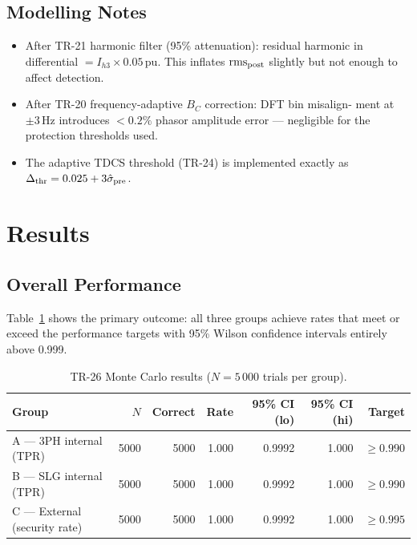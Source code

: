 \documentclass[11pt,a4paper]{article}
\begin{document}
\subsection{Modelling Notes}

\begin{itemize}
  \item After TR-21 harmonic filter (95\% attenuation): residual harmonic
    in differential $= I_{h3} \times 0.05$\,pu.  This inflates
    $\mathrm{rms}_{\rm post}$ slightly but not enough to affect detection.
  \item After TR-20 frequency-adaptive $B_C$ correction: DFT bin misalign-
    ment at $\pm 3$\,Hz introduces $<0.2\%$ phasor amplitude error —
    negligible for the protection thresholds used.
  \item The adaptive TDCS threshold (TR-24) is implemented exactly as
    $\Delta_{\rm thr} = 0.025 + 3\hat{\sigma}_{\rm pre}$.
\end{itemize}

\section{Results}

\subsection{Overall Performance}

Table~\ref{tab:results} shows the primary outcome: all three groups achieve
rates that meet or exceed the performance targets with 95\% Wilson
confidence intervals entirely above 0.999.

\begin{table}[h!]
\centering
\caption{TR-26 Monte Carlo results ($N = 5\,000$ trials per group).}
\label{tab:results}
\begin{tabular}{lrrrrrr}
\toprule
Group & $N$ & Correct & Rate & 95\% CI (lo) & 95\% CI (hi) & Target \\
\midrule
A — 3PH internal (TPR)       & 5000 & 5000 & 1.000 & 0.9992 & 1.000 & $\geq 0.990$ \\
B — SLG internal (TPR)       & 5000 & 5000 & 1.000 & 0.9992 & 1.000 & $\geq 0.990$ \\
C — External (security rate) & 5000 & 5000 & 1.000 & 0.9992 & 1.000 & $\geq 0.995$ \\
\bottomrule
\end{tabular}
\end{table}
\end{document}
